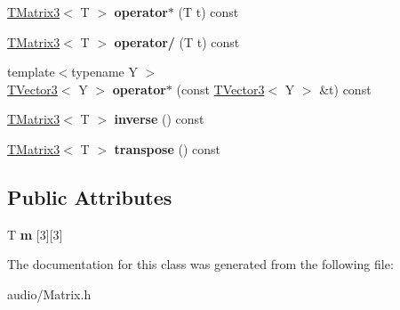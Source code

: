 \begin{DoxyCompactItemize}
\item 
\hyperlink{classAudio_1_1TMatrix3}{T\+Matrix3}$<$ T $>$ {\bfseries operator$\ast$} (T t) const \hypertarget{classAudio_1_1TMatrix3_ab8caa8d80edc781776329ef7cb94be2f}{}\label{classAudio_1_1TMatrix3_ab8caa8d80edc781776329ef7cb94be2f}

\item 
\hyperlink{classAudio_1_1TMatrix3}{T\+Matrix3}$<$ T $>$ {\bfseries operator/} (T t) const \hypertarget{classAudio_1_1TMatrix3_a1d34ce09f3821bf8cd1c2b191b91543b}{}\label{classAudio_1_1TMatrix3_a1d34ce09f3821bf8cd1c2b191b91543b}

\item 
{\footnotesize template$<$typename Y $>$ }\\\hyperlink{classAudio_1_1TVector3}{T\+Vector3}$<$ Y $>$ {\bfseries operator$\ast$} (const \hyperlink{classAudio_1_1TVector3}{T\+Vector3}$<$ Y $>$ \&t) const \hypertarget{classAudio_1_1TMatrix3_ab68394bcade62889ad4e716e3a2e3dc2}{}\label{classAudio_1_1TMatrix3_ab68394bcade62889ad4e716e3a2e3dc2}

\item 
\hyperlink{classAudio_1_1TMatrix3}{T\+Matrix3}$<$ T $>$ {\bfseries inverse} () const \hypertarget{classAudio_1_1TMatrix3_a3b0ed36b789ed04354ef4bbbe8511f12}{}\label{classAudio_1_1TMatrix3_a3b0ed36b789ed04354ef4bbbe8511f12}

\item 
\hyperlink{classAudio_1_1TMatrix3}{T\+Matrix3}$<$ T $>$ {\bfseries transpose} () const \hypertarget{classAudio_1_1TMatrix3_a8e52d62efc69ffec4c0f453fd44706e3}{}\label{classAudio_1_1TMatrix3_a8e52d62efc69ffec4c0f453fd44706e3}

\end{DoxyCompactItemize}
\subsection*{Public Attributes}
\begin{DoxyCompactItemize}
\item 
T {\bfseries m} \mbox{[}3\mbox{]}\mbox{[}3\mbox{]}\hypertarget{classAudio_1_1TMatrix3_ab6ea6e8b50c858618e5548f7f36d8025}{}\label{classAudio_1_1TMatrix3_ab6ea6e8b50c858618e5548f7f36d8025}

\end{DoxyCompactItemize}


The documentation for this class was generated from the following file\+:\begin{DoxyCompactItemize}
\item 
audio/Matrix.\+h\end{DoxyCompactItemize}
